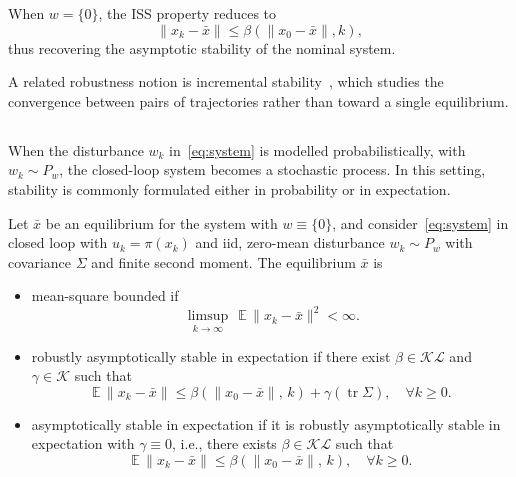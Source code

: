 When $w = \{0\}$, the ISS property reduces to
\[
	\|x_k - \bar x\|
	\le
	\beta(\|x_0 - \bar x\|, k),
\]
thus recovering the asymptotic stability of the nominal system. %

A related robustness notion is incremental stability~\cite{angeli2002lyapunov}, which studies the convergence between pairs of trajectories rather than toward a single equilibrium. 

\subsection{\texorpdfstring{}{Stochastic Stability}}
When the disturbance $w_k$ in~\eqref{eq:system} is modelled probabilistically, with $w_k \sim P_w$, the closed-loop system becomes a stochastic process. In this setting, stability is commonly formulated either in probability or in expectation.

\begin{defn}\label{def:stochstab}
	Let $\bar x$ be an equilibrium for the system with $w \equiv \{0\}$, and consider~\eqref{eq:system} in closed loop with $u_k = \pi(x_k)$ and \ac{iid}, zero-mean disturbance $w_k \sim P_w$ with covariance $\Sigma$ and finite second moment. The equilibrium $\bar x$ is
	\begin{itemize}
		\item mean-square bounded if
		      \[
			      \limsup_{k \to \infty}\:\:
			      \mathbb{E}\,\|x_k - \bar x\|^2 < \infty .
		      \]
		\item robustly asymptotically stable in expectation if there exist $\beta \in \mathcal{KL}$ and $\gamma \in \mathcal{K}$ such that
		      \[
			      \mathbb{E}\,\|x_k - \bar x\|
			      \le \beta(\|x_0 - \bar x\|,\,k) + \gamma(\operatorname{tr}\Sigma),
			      \quad \forall k \geq 0.
		      \]
		\item asymptotically stable in expectation if it is robustly asymptotically stable in expectation with $\gamma \equiv 0$, i.e., there exists  $\beta \in \mathcal{KL}$ such that
		      \[
			      \mathbb{E}\,\|x_k - \bar x\|
			      \le \beta(\|x_0 - \bar x\|,\,k),
			      \quad \forall k \geq 0.
		      \]
	\end{itemize}
\end{defn}

